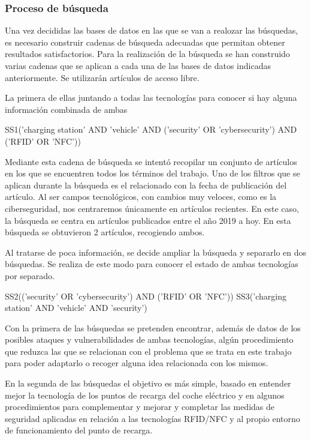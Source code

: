 \documentclass[12pt,a4paper,onecolumn,oneside]{report}
\begin{document}
\subsubsection{Proceso de búsqueda}

Una vez decididas las bases de datos en las que se van a realozar las búsquedas, es necesario construir cadenas de búsqueda adecuadas que permitan obtener resultados satisfactorios. Para la realización de la búsqueda se han construido varias cadenas que se aplican a cada una de las bases de datos indicadas anteriormente. Se utilizarán artículos de acceso libre.

La primera de ellas juntando a todas las tecnologías para conocer si hay alguna información combinada de ambas

SS1('charging station' AND 'vehicle' AND ('security' OR 'cybersecurity') AND ('RFID' OR 'NFC'))

Mediante esta cadena de búsqueda se intentó recopilar un conjunto de artículos en los que se encuentren todos los términos del trabajo. Uno de los filtros que se aplican durante la búsqueda es el relacionado con la fecha de publicación del artículo. Al ser campos tecnológicos, con cambios muy veloces, como es la ciberseguridad, nos centraremos únicamente en artículos recientes. En este caso, la búsqueda se centra en artículos publicados entre el año 2019 a hoy. En esta búsqueda se obtuvieron 2 artículos, recogiendo ambos. 

Al tratarse de poca información, se decide ampliar la búsqueda y separarlo en dos búsquedas. Se realiza de este modo para conocer el estado de ambas tecnologías por separado. 

SS2(('security' OR 'cybersecurity') AND ('RFID' OR 'NFC'))
SS3('charging station' AND 'vehicle' AND 'security')

Con la primera de las búsquedas se pretenden encontrar, además de datos de los posibles ataques y vulnerabilidades de ambas tecnologías, algún procedimiento que reduzca las que se relacionan con el problema que se trata en este trabajo para poder adaptarlo o recoger alguna idea relacionada con los mismos.

En la segunda de las búsquedas el objetivo es más simple, basado en entender mejor la tecnología de los puntos de recarga del coche eléctrico y en algunos procedimientos para complementar y mejorar y completar las medidas de seguridad aplicadas en relación a las tecnologías RFID/NFC y al propio entorno de funcionamiento del punto de recarga.
\end{document}
